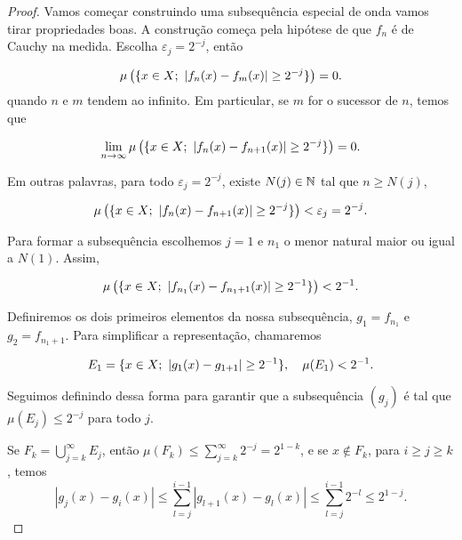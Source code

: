 \begin{proof}Vamos começar construindo uma subsequência especial de onda vamos tirar propriedades boas. A construção começa pela hipótese de que $f_n$ é de Cauchy na medida. Escolha $\varepsilon_j = 2^{-j}$, então

\begin{equation*}
    \mu\left(\{x\in X; \ \left| f_n(x)-f_m(x) \right| \geq 2^{-j}\}\right)=0.
\end{equation*}
quando $n$ e $m$ tendem ao infinito. Em particular, se $m$ for o sucessor de $n$, temos que

\begin{equation*}
    \lim_{n\rightarrow \infty}\mu\left(\{x\in X; \ \left| f_n(x)-f_{n+1}(x) \right| \geq 2^{-j}\}\right)=0.
\end{equation*}

Em outras palavras, para todo $\varepsilon_j=2^{-j}$, existe $N(j)\in\mathbb{N}$ tal que $n\geq N(j)$,

\begin{equation*}
    \mu\left(\{x\in X; \ \abs{f_n(x)-f_{n+1}(x)} \geq 2^{-j}\}\right) < \varepsilon_j = 2^{-j}.
\end{equation*}

Para formar a subsequência escolhemos $j=1$ e $n_1$ o menor natural maior ou igual a $N(1)$. Assim, 

\begin{equation*}
    \mu\left(\{x\in X; \ \abs{f_{n_1}(x)-f_{n_1+1}(x)} \geq 2^{-1}\}\right) < 2^{-1}.
\end{equation*}

Definiremos os dois primeiros elementos da nossa subsequência, $g_1=f_{n_1}$ e $g_2=f_{n_1+1}$. Para simplificar a representação, chamaremos

\begin{equation*}
    E_1=\{x\in X; \ \left| g_1(x)-g_{1+1} \right| \geq 2^{-1}\}, \quad \mu(E_1) < 2^{-1}.
\end{equation*}

Seguimos definindo dessa forma para garantir que a subsequência $(g_j)$ é tal que $\mu(E_j) \leq 2^{-j}$ para todo $j$.

Se $F_k = \bigcup_{j=k}^{\infty} E_j$, então $\mu(F_k) \leq \sum_{j=k}^{\infty} 2^{-j} = 2^{1-k}$, e se $x \notin F_k$, para $i \geq j \geq k$, temos
    \begin{equation}\label{prop:cauchy_in_measure/eq1}
        |g_j(x) - g_i(x)| \leq \sum_{l=j}^{i-1} |g_{l+1}(x) - g_l(x)| \leq \sum_{l=j}^{i-1} 2^{-l} \leq 2^{1-j}.
    \end{equation}


\end{proof}
